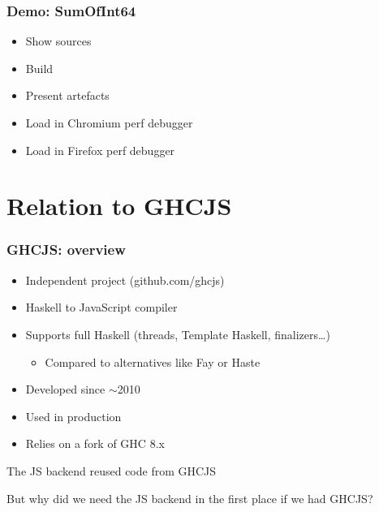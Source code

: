 \documentclass{beamer}
\begin{document}
\begin{frame}
\frametitle{Demo: SumOfInt64}
\begin{itemize}
\item Show sources
\item Build
\item Present artefacts
\item Load in Chromium perf debugger
\item Load in Firefox perf debugger
\end{itemize}
\end{frame}

\section{Relation to GHCJS}

\begin{frame}
\frametitle{GHCJS: overview}
\begin{itemize}
\item Independent project (github.com/ghcjs)
\item Haskell to JavaScript compiler
\item Supports full Haskell (threads, Template Haskell, finalizers…)
\begin{itemize}
\item Compared to alternatives like Fay or Haste
\end{itemize}
\item Developed since $\sim$2010
\item Used in production
\item Relies on a fork of GHC 8.x
\end{itemize}
\begin{center}
\alert{The JS backend reused code from GHCJS}
\end{center}
But why did we need the JS backend in the first place if we had GHCJS?
\end{frame}
\end{document}
